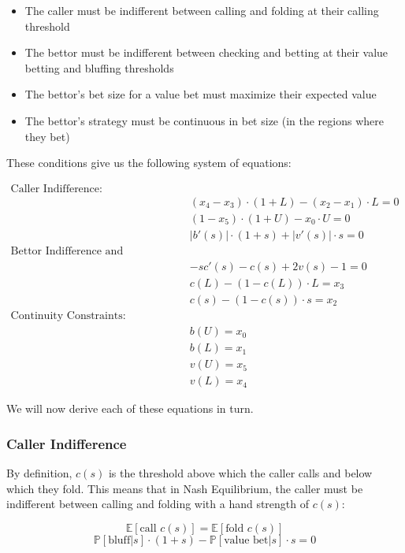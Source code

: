 \documentclass[../../main/main.tex]{subfiles}
\begin{document}
\begin{itemize}
    \item The caller must be indifferent between calling and folding at their calling threshold
    \item The bettor must be indifferent between checking and betting at their value betting and bluffing thresholds
    \item The bettor's bet size for a value bet must maximize their expected value
    \item The bettor's strategy must be continuous in bet size (in the regions where they bet)
\end{itemize}

These conditions give us the following system of equations:

\begin{align*}
    \text{Caller Indifference:} & \\
    & (x_4-x_3) \cdot (1+L) - (x_2-x_1) \cdot L = 0\\
    & (1-x_5) \cdot (1+U) - x_0 \cdot U = 0\\
    & |b'(s)| \cdot (1 + s) + |v'(s)| \cdot s = 0\\
    \text{Bettor Indifference and Optimality:} & \\
    & -sc'(s) - c(s) + 2 v(s) - 1 = 0\\
    & c(L) - (1-c(L)) \cdot L = x_3\\
    & c(s) - (1-c(s)) \cdot s = x_2\\
    \text{Continuity Constraints:} & \\
    & b(U) = x_0 \\
    & b(L) = x_1 \\
    & v(U) = x_5 \\
    & v(L) = x_4
\end{align*}

We will now derive each of these equations in turn.

\subsubsection{Caller Indifference}
\label{subsec:caller_indifference}

By definition, $c(s)$ is the threshold above which the caller calls and below which they fold. This means that in Nash Equilibrium, the caller must be indifferent between calling and folding with a hand strength of $c(s)$:


  \[  \mathbb{E}[\text{call } c(s)] = \mathbb{E}[\text{fold } c(s)] \]
  \[  \mathbb{P}[\text{bluff} | s] \cdot (1+s) - \mathbb{P}[\text{value bet} | s]\cdot s = 0 \]
\end{document}
